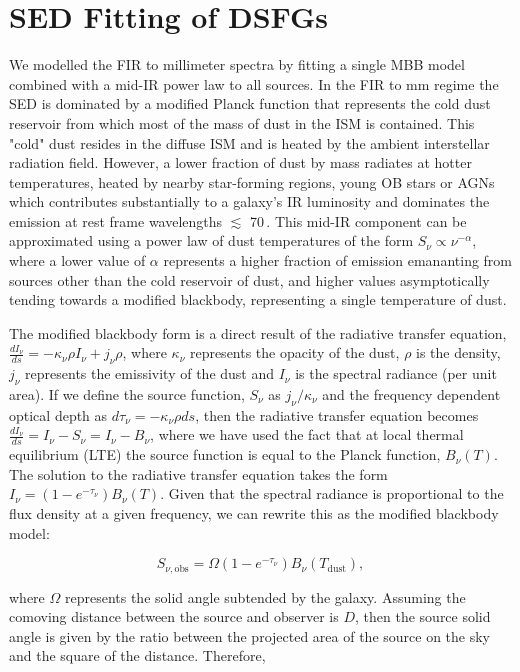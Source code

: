 \section{SED Fitting of DSFGs}

We modelled the FIR to millimeter spectra by fitting a single MBB model combined with a mid-IR power law to all sources. In the FIR to mm regime the SED is dominated by a modified Planck function that represents the cold dust reservoir from which most of the mass of dust in the ISM is contained. This "cold" dust resides in the diffuse ISM and is heated by the ambient interstellar radiation field. However, a lower fraction of dust by mass radiates at hotter temperatures, heated by nearby star-forming regions, young OB stars or AGNs which contributes substantially to a galaxy's IR luminosity and dominates the emission at rest frame wavelengths $\lesssim$ 70\,\micron. This mid-IR component can be approximated using a power law of dust temperatures of the form $S_\nu \propto \nu^{-\alpha}$, where a lower value of $\alpha$ represents a higher fraction of emission emananting from sources other than the cold reservoir of dust, and higher values asymptotically tending towards a modified blackbody, representing a single temperature of dust.

The modified blackbody form is a direct result of the radiative transfer equation, $\frac{dI_\nu}{ds} = -\kappa_\nu \rho I_\nu + j_\nu \rho$, where $\kappa_\nu$ represents the opacity of the dust, $\rho$ is the density, $j_\nu$ represents the emissivity of the dust and $I_\nu$ is the spectral radiance (per unit area). If we define the source function, $S_\nu$ as $j_\nu/\kappa_\nu$ and the frequency dependent optical depth as $d\tau_\nu = -\kappa_\nu \rho ds$, then the radiative transfer equation becomes $\frac{dI_\nu}{ds} = I_\nu - S_\nu = I_\nu - B_\nu$, where we have used the fact that at local thermal equilibrium (LTE) the source function is equal to the Planck function, $B_\nu(T)$. The solution to the radiative transfer equation takes the form $I_\nu = (1 - e^{-\tau_\nu}) B_\nu(T)$. Given that the spectral radiance is proportional to the flux density at a given frequency, we can rewrite this as the modified blackbody model:

\begin{equation}
	S_{\nu, \textrm{obs}} = \Omega(1 - e^{-\tau_\nu}) B_\nu(T_{\textrm{dust}}),
\label{eq:modified_blackbody_omega}
\end{equation}

where $\Omega$ represents the solid angle subtended by the galaxy. Assuming the comoving distance between the source and observer is $D$, then the source solid angle is given by the ratio between the projected area of the source on the sky and the square of the distance. Therefore,

